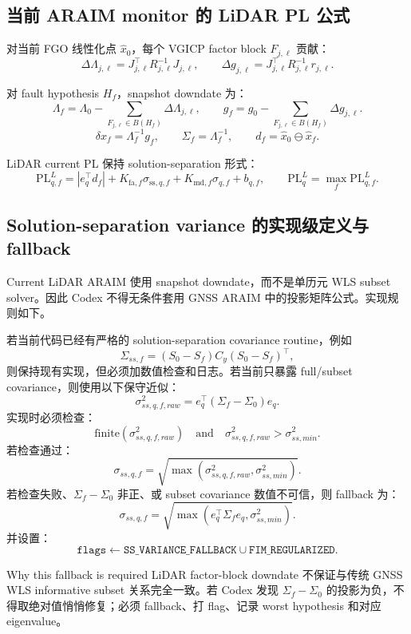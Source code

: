 \documentclass[11pt,a4paper]{article}
\newcommand{\PL}{\mathrm{PL}}
\newcommand{\Lam}{\Lambda}
\newcommand{\Sig}{\Sigma}
\begin{document}
\subsection{当前 ARAIM monitor 的 LiDAR PL 公式}

对当前 FGO 线性化点 $\hat{x}_0$，每个 VGICP factor block $F_{j,\ell}$ 贡献：
\[
  \Delta \Lam_{j,\ell}=J_{j,\ell}^\top R_{j,\ell}^{-1}J_{j,\ell},
  \qquad
  \Delta g_{j,\ell}=J_{j,\ell}^\top R_{j,\ell}^{-1}r_{j,\ell}.
\]

对 fault hypothesis $H_f$，snapshot downdate 为：
\[
  \Lam_f=\Lam_0-\sum_{F_{j,\ell}\in B(H_f)}\Delta \Lam_{j,\ell},
  \qquad
  g_f=g_0-\sum_{F_{j,\ell}\in B(H_f)}\Delta g_{j,\ell}.
\]
\[
  \delta x_f=\Lam_f^{-1}g_f,
  \qquad
  \Sig_f=\Lam_f^{-1},
  \qquad
  d_f=\hat{x}_0\ominus \hat{x}_f.
\]

LiDAR current PL 保持 solution-separation 形式：
\[
  \boxed{
    \PL^L_{q,f}
    =
    |e_q^\top d_f|
    +K_{\mathrm{fa},f}\sigma_{\mathrm{ss},q,f}
    +K_{\mathrm{md},f}\sigma_{q,f}
    +b_{q,f},
    \qquad
    \PL^L_q=\max_f\PL^L_{q,f}.
  }
\]


\subsection{Solution-separation variance 的实现级定义与 fallback}

Current LiDAR ARAIM 使用 snapshot downdate，而不是单历元 WLS subset solver。因此 Codex 不得无条件套用 GNSS ARAIM 中的投影矩阵公式。实现规则如下。

若当前代码已经有严格的 solution-separation covariance routine，例如
\[
  \Sigma_{ss,f}=(S_0-S_f)C_y(S_0-S_f)^\top,
\]
则保持现有实现，但必须加数值检查和日志。若当前只暴露 full/subset covariance，则使用以下保守近似：
\[
  \sigma^2_{ss,q,f,raw}=e_q^\top(\Sigma_f-\Sigma_0)e_q.
\]
实现时必须检查：
\[
  \mathrm{finite}(\sigma^2_{ss,q,f,raw})\quad\text{and}\quad \sigma^2_{ss,q,f,raw}>\sigma^2_{ss,min}.
\]
若检查通过：
\[
  \boxed{\sigma_{ss,q,f}=\sqrt{\max(\sigma^2_{ss,q,f,raw},\sigma^2_{ss,min})}.}
\]
若检查失败、$\Sigma_f-\Sigma_0$ 非正、或 subset covariance 数值不可信，则 fallback 为：
\[
  \boxed{\sigma_{ss,q,f}=\sqrt{\max(e_q^\top\Sigma_f e_q,\sigma^2_{ss,min})}.}
\]
并设置：
\[
  \texttt{flags}\leftarrow\texttt{SS\_VARIANCE\_FALLBACK}\cup\texttt{FIM\_REGULARIZED}.
\]

\begin{warningbox}{Why this fallback is required}
  LiDAR factor-block downdate 不保证与传统 GNSS WLS informative subset 关系完全一致。若 Codex 发现 $\Sigma_f-\Sigma_0$ 的投影为负，不得取绝对值悄悄修复；必须 fallback、打 flag、记录 worst hypothesis 和对应 eigenvalue。
\end{warningbox}
\end{document}
